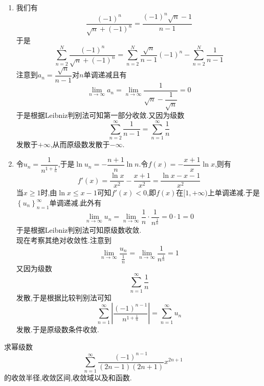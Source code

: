 \documentclass{ctexart}
\begin{document}
\begin{solution}
    \begin{enumerate}[label=\tbf{(\arabic*)},topsep=0pt,parsep=0pt,itemsep=0pt,partopsep=0pt]
        \item 我们有
            \[\dfrac{(-1)^n}{\sqrt{n}+(-1)^n}=\dfrac{(-1)^n\sqrt{n}-1}{n-1}\]
            于是
            \[\sum_{n=2}^{N}\dfrac{(-1)^n}{\sqrt{n}+(-1)^n}
            =\sum_{n=2}^{N}\dfrac{\sqrt{n}}{n-1}(-1)^{n}-\sum_{n=2}^{N}\dfrac{1}{n-1}\]
            注意到$a_n=\dfrac{\sqrt{n}}{n-1}$对$n$单调递减且有
            \[\lim_{n\to\infty}a_n=\lim_{n\to\infty}\dfrac{1}{\sqrt{n}-\dfrac{1}{\sqrt{n}}}=0\]
            于是根据Leibniz判别法可知第一部分收敛.又因为级数
            \[\sum_{n=2}^{\infty}\dfrac{1}{n-1}=\sum_{n=1}^{\infty}\dfrac1n\]
            发散于$+\infty$,从而原级数发散于$-\infty$.
        \item 令$u_n=\dfrac{1}{n^{1+\frac1n}}$,于是$\ln u_n=-\dfrac{n+1}{n}\ln n$.令$f(x)=-\dfrac{x+1}{x}\ln x$,则有
            \[f'(x)=\dfrac{\ln x}{x^2}-\dfrac{x+1}{x^2}=\dfrac{\ln x-x-1}{x^2}\]
            当$x\geqslant1$时,由$\ln x\leqslant x-1$可知$f'(x)<0$,即$f(x)$在$[1,+\infty)$上单调递减.于是$\left\{u_n\right\}_{n=1}^{\infty}$单调递减.此外有
            \[\lim_{n\to\infty}u_n=\lim_{n\to\infty}\dfrac{1}{n}\cdot\dfrac{1}{n^{\frac1n}}=0\cdot1=0\]
            于是根据Leibniz判别法可知原级数收敛.\\
            现在考察其绝对收敛性.注意到
            \[\lim_{n\to\infty}\dfrac{u_n}{\frac1n}=\lim_{n\to\infty}\dfrac{1}{n^{\frac1n}}=1\]
            又因为级数
            \[\sum_{n=1}^{\infty}\dfrac1n\]
            发散,于是根据比较判别法可知
            \[\sum_{n=1}^{\infty}\left|\dfrac{(-1)^{n-1}}{n^{1+\frac1n}}\right|=\sum_{n=1}^{\infty}u_n\]
            发散.于是原级数条件收敛.
    \end{enumerate}
\end{solution}
\begin{problem}[3.(16\songti{分})]
    求幂级数
    \[\sum_{n=1}^{\infty}\dfrac{(-1)^{n-1}}{(2n-1)(2n+1)}x^{2n+1}\]
    的收敛半径,收敛区间,收敛域以及和函数.

\end{problem}
\end{document}
